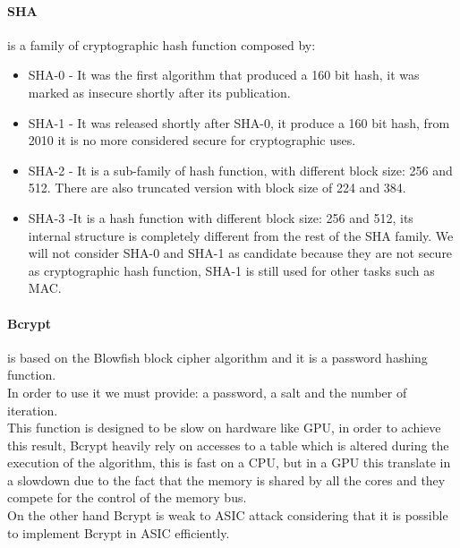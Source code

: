 \paragraph{SHA} is a family of cryptographic hash function composed by:
\begin{itemize}
	\item SHA-0 - It was the first algorithm that produced a 160 bit hash, it was marked as insecure shortly after its publication.
	\item SHA-1 - It was released shortly after SHA-0, it produce a 160 bit hash, from 2010 it is no more considered secure for cryptographic uses.
	\item SHA-2 - It is a sub-family of hash function, with different block size: 256 and 512.
	There are also truncated version with block size of 224 and 384.
	\item SHA-3 -It is a hash function with different block size: 256 and 512, its internal structure is completely different from the rest of the SHA family.
	We will not consider SHA-0 and SHA-1 as candidate because they are not secure as cryptographic hash function, SHA-1 is still used for other tasks such as MAC\cite{sha}.
\end{itemize}


\paragraph{Bcrypt} is based on the Blowfish block cipher algorithm and it is a password hashing function.\\
In order to use it we must provide: a password, a salt and the number of iteration.\\
This function is designed to be slow on hardware like GPU, in order to achieve this result, Bcrypt heavily rely on accesses to a table which is altered during the execution of the algorithm, this is fast on a CPU, but in a GPU this translate in a slowdown due to the fact that the memory is shared by all the cores and they compete for the control of the memory bus.\\
On the other hand Bcrypt is weak to ASIC attack considering that it is possible to implement Bcrypt in ASIC efficiently\cite{bcrypt}.


